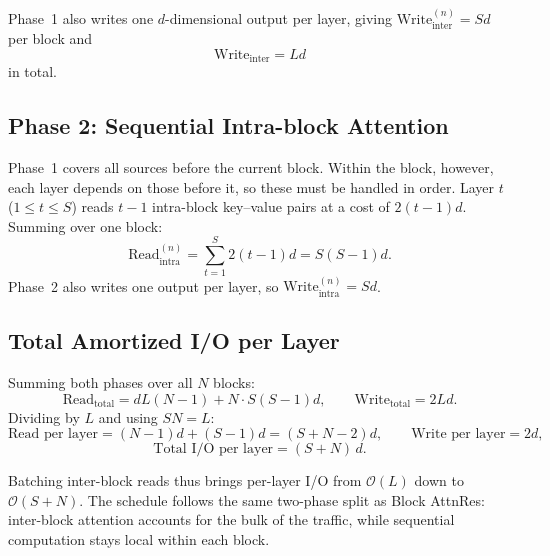 Phase~1 also writes one $d$-dimensional output per layer, giving $\mathrm{Write}_{\text{inter}}^{(n)} = Sd$ per block and
\begin{equation}
    \mathrm{Write}_{\text{inter}} = Ld
\end{equation}
in total.

\subsection*{Phase 2: Sequential Intra-block Attention}

Phase~1 covers all sources before the current block. Within the block, however, each layer depends on those before it, so these must be handled in order. Layer $t$ ($1 \le t \le S$) reads $t{-}1$ intra-block key--value pairs at a cost of $2(t{-}1)d$. Summing over one block:
\begin{equation}
    \mathrm{Read}_{\text{intra}}^{(n)} = \sum_{t=1}^{S} 2(t-1)d = S(S-1)d.
\end{equation}
Phase~2 also writes one output per layer, so $\mathrm{Write}_{\text{intra}}^{(n)} = Sd$.

\subsection*{Total Amortized I/O per Layer}

Summing both phases over all $N$ blocks:
\begin{equation}
    \mathrm{Read}_{\text{total}} = dL(N-1) + N \cdot S(S-1)d, \qquad
    \mathrm{Write}_{\text{total}} = 2Ld.
\end{equation}
Dividing by $L$ and using $SN=L$:
\begin{equation}
    \text{Read per layer} = (N-1)d + (S-1)d = (S + N - 2)d, \qquad
    \text{Write per layer} = 2d,
\end{equation}
\begin{equation}
    \boxed{\;\text{Total I/O per layer} = (S + N)\,d.\;}
\end{equation}

Batching inter-block reads thus brings per-layer I/O from $\mathcal{O}(L)$ down to $\mathcal{O}(S{+}N)$. The schedule follows the same two-phase split as Block AttnRes: inter-block attention accounts for the bulk of the traffic, while sequential computation stays local within each block.
